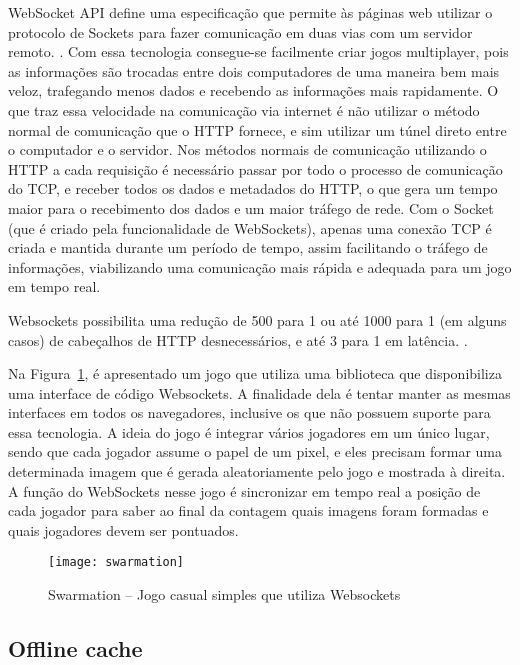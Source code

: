 WebSocket API define uma especificação que permite às páginas web
utilizar o protocolo de Sockets para fazer comunicação em duas
vias com um servidor remoto. \cite{website:w3cwebsockets}. Com essa tecnologia
consegue-se facilmente criar jogos multiplayer, pois as informações
são trocadas entre dois computadores de uma maneira bem mais
veloz, trafegando menos dados e recebendo as informações mais
rapidamente.
O que traz essa velocidade na comunicação via internet é não utilizar
o método normal de comunicação que o HTTP fornece, e sim utilizar um
túnel direto entre o computador e o servidor.
Nos métodos normais de comunicação utilizando o HTTP a cada requisição
é necessário passar por todo o processo de comunicação do TCP, e
receber todos os dados e metadados do HTTP, o que gera um tempo maior para
o recebimento dos dados e um maior tráfego de rede. Com o Socket (que
é criado pela funcionalidade de WebSockets), apenas uma conexão TCP é
criada e mantida durante um período de tempo, assim facilitando o
tráfego de informações, viabilizando uma comunicação mais rápida e
adequada para um jogo em tempo real.

Websockets possibilita uma redução de 500 para 1 ou até 1000 para 1
(em alguns casos) de cabeçalhos de HTTP desnecessários, e até 3 para 1
em latência. \cite{lubbers2010pro}.

Na Figura~\ref{img:swarmation}, é apresentado um jogo que utiliza
uma biblioteca que disponibiliza uma interface de código Websockets.
A finalidade dela é tentar manter as mesmas interfaces em
todos os navegadores, inclusive os que não possuem suporte para essa
tecnologia. A ideia do jogo é integrar vários jogadores em um único lugar, sendo que
cada jogador assume o papel de um pixel, e eles precisam formar uma
determinada imagem que é gerada aleatoriamente pelo jogo e mostrada à
direita. A função do WebSockets nesse jogo é sincronizar em tempo real a
posição de cada jogador para saber ao final da contagem quais imagens
foram formadas e quais jogadores devem ser pontuados.

\begin{figure}[H]
  \centering
	\texttt{[image: swarmation]}
  \caption{Swarmation {--} Jogo casual simples que utiliza Websockets}
  \label{img:swarmation}
\end{figure}


\subsection{Offline cache}

